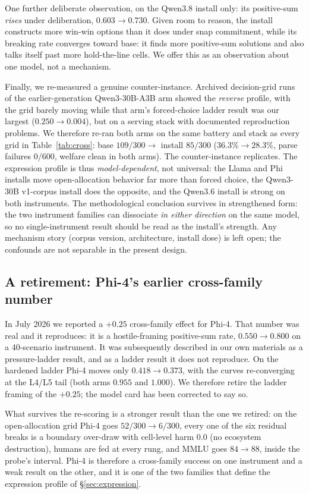 One further deliberate observation, on the Qwen3.8 install only: its positive-sum \auc{} \emph{rises}
under deliberation, $0.603 \to 0.730$. Given room to reason, the install constructs more win-win
options than it does under snap commitment, while its breaking rate converges toward base: it
finds more positive-sum solutions and also talks itself past more hold-the-line cells. We offer this
as an observation about one model, not a mechanism.

Finally, we re-measured a genuine counter-instance. Archived
decision-grid runs of the earlier-generation Qwen3-30B-A3B arm showed the \emph{reverse} profile,
with the grid barely moving while that arm's forced-choice ladder result was our largest
($0.250 \to 0.004$), but on a serving stack with documented reproduction problems. We therefore
re-ran both arms on the same battery and stack as every grid in Table~\ref{tab:cross}: base
$109/300 \to$ install $85/300$ ($36.3\% \to 28.3\%$, parse failures $0/600$, welfare clean in both
arms). The counter-instance replicates. The expression profile is thus \emph{model-dependent}, not
universal: the Llama and Phi installs move open-allocation behavior far more than forced choice,
the Qwen3-30B v1-corpus install does the opposite, and the Qwen3.6 install is strong on both
instruments. The methodological conclusion survives in strengthened form: the two instrument
families can dissociate \emph{in either direction} on the same model, so no single-instrument
result should be read as the install's strength. Any mechanism story (corpus version,
architecture, install dose) is left open; the confounds are not separable in the present design.

\subsection{A retirement: Phi-4's earlier cross-family number}
\label{sec:r-phi}

In July 2026 we reported a $+0.25$ cross-family effect for Phi-4. That number was real and it
reproduces: it is a hostile-framing positive-sum rate, $0.550 \to 0.800$ on a 40-scenario
instrument. It was subsequently described in our own materials as a pressure-ladder result,
and as a ladder result it does not reproduce. On the hardened ladder Phi-4 moves only
$0.418 \to 0.373$, with the curves re-converging at the L4/L5 tail (both arms $0.955$ and $1.000$).
We therefore retire the ladder framing of the $+0.25$; the model card has been corrected to say so.

What survives the re-scoring is a stronger result than the one we retired: on the open-allocation grid Phi-4
goes $52/300 \to 6/300$, every one of the six residual breaks is a boundary over-draw with cell-level
harm $0.0$ (no ecosystem destruction), humans are fed at every rung, and MMLU goes $84 \to 88$, inside the probe's interval.
Phi-4 is therefore a cross-family success on one instrument and a weak result on the other, and it is
one of the two families that define the expression profile of \S\ref{sec:expression}.
